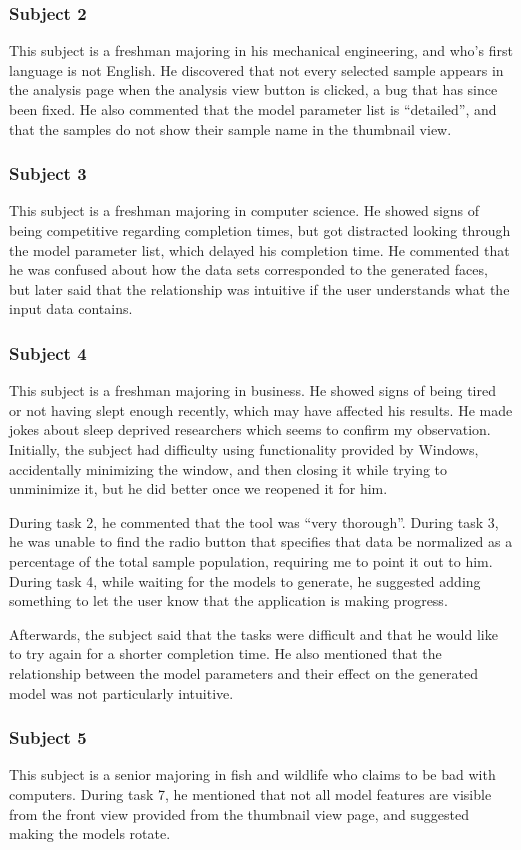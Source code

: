 \documentclass[letterpaper,10pt, onecolumn, draftclsnofoot]{IEEEtran}
\begin{document}
\subsubsection{Subject 2}
This subject is a freshman majoring in his mechanical engineering, and who's first language is not English. He discovered that not every selected sample appears in the analysis page when the analysis view button is clicked, a bug that has since been fixed. He also commented that the model parameter list is ``detailed'', and that the samples do not show their sample name in the thumbnail view.

\subsubsection{Subject 3}
This subject is a freshman majoring in computer science. He showed signs of being competitive regarding completion times, but got distracted looking through the model parameter list, which delayed his completion time. He commented that he was confused about how the data sets corresponded to the generated faces, but later said that the relationship was intuitive if the user understands what the input data contains.

\subsubsection{Subject 4}
This subject is a freshman majoring in business. He showed signs of being tired or not having slept enough recently, which may have affected his results. He made jokes about sleep deprived researchers which seems to confirm my observation. Initially, the subject had difficulty using functionality provided by Windows, accidentally minimizing the window, and then closing it while trying to unminimize it, but he did better once we reopened it for him. 

During task 2, he commented that the tool was ``very thorough''. During task 3, he was unable to find the radio button that specifies that data be normalized as a percentage of the total sample population, requiring me to point it out to him. During task 4, while waiting for the models to generate, he suggested adding something to let the user know that the application is making progress.

Afterwards, the subject said that the tasks were difficult and that he would like to try again for a shorter completion time. He also mentioned that the relationship between the model parameters and their effect on the generated model was not particularly intuitive.

\subsubsection{Subject 5}
This subject is a senior majoring in fish and wildlife who claims to be bad with computers. During task 7, he mentioned that not all model features are visible from the front view provided from the thumbnail view page, and suggested making the models rotate.
\end{document}
